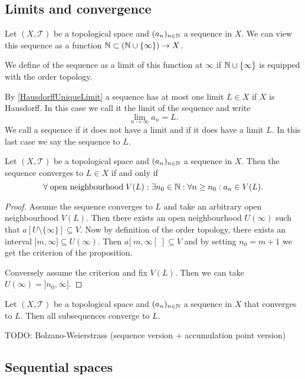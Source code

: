 \subsection{Limits and convergence}
\begin{definition}
Let $(X,\mathcal{T})$ be a topological space and $(a_n)_{n\in\mathbb{N}}$ a sequence in $X$. We can view this sequence as a function $\mathbb{N}\subset (\mathbb{N}\cup\{\infty\})\to X$.

We define  of the sequence as a limit of this function at $\infty$ if $\mathbb{N}\cup\{\infty\}$ is equipped with the order topology.
\end{definition}
By \ref{HausdorffUniqueLimit} a sequence has at most one limit $L\in X$ if $X$ is Hausdorff. In this case we call it the limit of the sequence and write
\[ \lim_{n\to \infty}a_n = L. \]
We call a sequence  if it does not have a limit and
  if it does have a limit $L$. In this last case we say the sequence  to $L$.

\begin{proposition} \label{sequenceConvergence}
Let $(X,\mathcal{T})$ be a topological space and $(a_n)_{n\in\mathbb{N}}$ a sequence in $X$. Then the sequence converges to $L\in X$ \textup{if and only if}
\[ \forall \;\text{open neighbourhood}\; V(L): \exists n_0\in \mathbb{N}: \forall n\geq n_0: a_n\in V(L). \]
\end{proposition}
\begin{proof}
Assume the sequence converges to $L$ and take an arbitrary open neighbourhood $V(L)$. Then there exists an open neighbourhood $U(\infty)$ such that $a[U\setminus\{\infty\}] \subseteq V$. Now by definition of the order topology, there exists an interval $]m, \infty]\subseteq U(\infty)$. Then $a[\;m, \infty[\;] \subseteq V$ and by setting $n_0=m+1$ we get the criterion of the proposition.

Conversely assume the criterion and fix $V(L)$. Then we can take $U(\infty)=]n_0, \infty]$.
\end{proof}

\begin{lemma} \label{subsequencesConverge}
Let $(X,\mathcal{T})$ be a topological space and $(a_n)_{n\in\mathbb{N}}$ a sequence in $X$ that converges to $L$. Then all subsequences converge to $L$.
\end{lemma}

TODO: Bolzano-Weierstrass (sequence version + accumulation point version)

\subsection{Sequential spaces}
